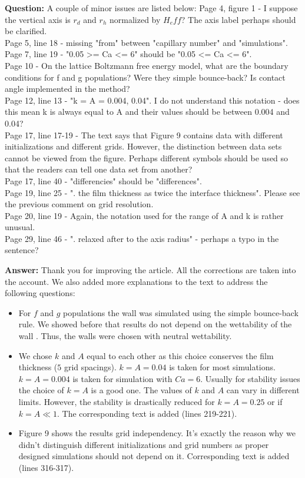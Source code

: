 \documentclass{article}
\begin{document}
\textbf{Question:} A couple of minor issues are listed below:
Page 4, figure 1 - I suppose the vertical axis is $r_d$ and $r_h$ normalized by $H_eff$?  The axis
label perhaps should be clarified.\\
Page 5, line 18 - missing "from" between "capillary number" and "simulations".\\
Page 7, line 19 - "0.05 >= Ca <= 6" should be "0.05 <= Ca <= 6".\\
Page 10 - On the lattice Boltzmann free energy model, what are the boundary conditions for f and g
populations?  Were they simple bounce-back?  Is contact angle implemented in the method?\\
Page 12, line 13 - "k = A = 0.004, 0.04".  I do not understand this notation - does this mean k is
always equal to A and their values should be between 0.004 and 0.04?\\
Page 17, line 17-19 - The text says that Figure 9 contains data with different initializations and
different grids.  However, the distinction between data sets cannot be viewed from the figure. 
Perhaps different symbols should be used so that the readers can tell one data set from another?\\
Page 17, line 40 - "differencies" should be "differences".\\
Page 19, line 25 - ". the film thickness as twice the interface thickness".  Please see the previous
comment on grid resolution.\\
Page 20, line 19 - Again, the notation used for the range of A and k is rather unusual.\\
Page 29, line 46 - ". relaxed after to the axis radius" - perhaps a typo in the sentence?

\textbf{Answer:} Thank you for improving the article. All the corrections are taken into the
account. We also added more explanations to the text to address the following questions:
\begin{itemize}
 \item For $f$ and $g$ populations the wall was simulated using the simple bounce-back rule. We
showed before that results do not depend on the wettability of the wall
\cite{kuzmin-binary2d}. Thus, the walls were chosen with neutral wettability. 
 \item We chose $k$ and $A$ equal to each other as this choice conserves the film thickness ($5$
grid spacings). $k=A=0.04$ is taken for most simulations. $k=A=0.004$ is taken for simulation with 
$Ca=6$. Usually for stability issues the choice of $k=A$ is a good one. The values of $k$ and $A$
can vary in different limits. However, the stability is drastically reduced for $k=A=0.25$ or if
$k=A \ll 1$. The corresponding text is added (lines 219-221).
\item Figure 9 shows the results grid independency. It's exactly the reason why we didn't
distinguish different initializations and grid numbers as proper designed simulations should not
depend on it. Corresponding text is added (lines 316-317).
\end{itemize}
\end{document}
